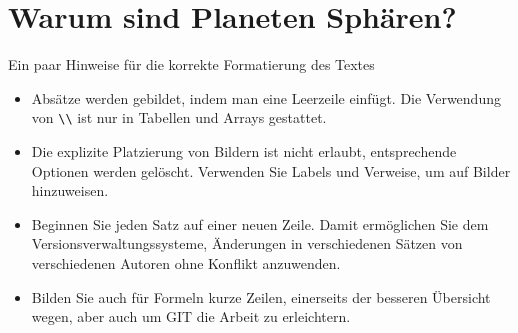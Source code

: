 %
%
%
%
\chapter{Warum sind Planeten Sphären?\label{chapter:planet}}
\begin{refsection}

Ein paar Hinweise für die korrekte Formatierung des Textes
\begin{itemize}
\item
Absätze werden gebildet, indem man eine Leerzeile einfügt.
Die Verwendung von \verb+\\+ ist nur in Tabellen und Arrays gestattet.
\item
Die explizite Platzierung von Bildern ist nicht erlaubt, entsprechende
Optionen werden gelöscht. 
Verwenden Sie Labels und Verweise, um auf Bilder hinzuweisen.
\item
Beginnen Sie jeden Satz auf einer neuen Zeile. 
Damit ermöglichen Sie dem Versionsverwaltungssysteme, Änderungen
in verschiedenen Sätzen von verschiedenen Autoren ohne Konflikt 
anzuwenden.
\item 
Bilden Sie auch für Formeln kurze Zeilen, einerseits der besseren
Übersicht wegen, aber auch um GIT die Arbeit zu erleichtern.
\end{itemize}






\printbibliography[heading=subbibliography]
\end{refsection}
